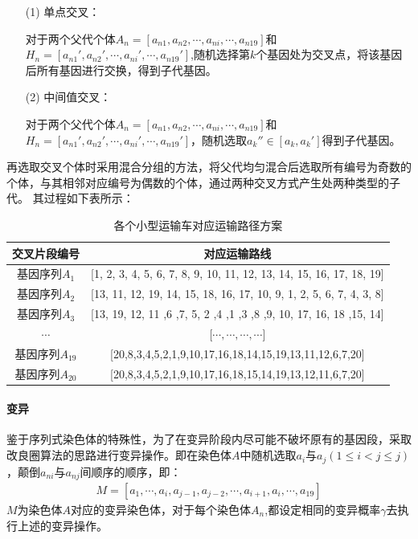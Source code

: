 \documentclass{whutmod}
\begin{document}
        \begin{itemize}
        	\item [(1)]单点交叉：
        	
        	对于两个父代个体$ A_n=[a_{n1},a_{n2},\cdots,a_{ni},\cdots,a_{n19}]$和$H_n=[a_{n1}',a_{n2}',\cdots,a_{ni}',\cdots,a_{n19}']$,随机选择第$k$个基因处为交叉点，将该基因后所有基因进行交换，得到子代基因。
        	\item [(2)]中间值交叉：
        	
        	对于两个父代个体$ A_n=[a_{n1},a_{n2},\cdots,a_{ni},\cdots,a_{n19}]$和	$H_n=[a_{n1}',a_{n2}',\cdots,a_{ni}',\cdots,a_{n19}']$，随机选取$a_{k}''\in [a_{k},a_{k}']$得到子代基因。
        \end{itemize}
        再选取交叉个体时采用混合分组的方法，将父代均匀混合后选取所有编号为奇数的个体，与其相邻对应编号为偶数的个体，通过两种交叉方式产生处两种类型的子代。
    	其过程如下表所示：
    	  	\begin{table}[H]
    		\centering	
    		  			\caption{各个小型运输车对应运输路径方案}\label{zhuansasgggggzai}
    		\begin{tabular}{cc}
    			\toprule[2pt]
    			\multicolumn{1}{m{3cm}}{\centering 交叉片段编号}
    			& \multicolumn{1}{m{8cm}}{\centering 对应运输路线}
    			\\
    			\midrule[1pt]
    			基因序列$A_1$ &  [1,	2,	3,	4,	5,	6,	7,	8,	9,	10,	11,	12,	13,	14,	15,	16,	17,	18,	19] \\ 
    			基因序列$A_2$ &  [13,	11,	12,	19,	14,	15,	18,	16,	17,	10,	9,	1,	2,	5,	6,	7,	4,	3,	8] \\ 
    			基因序列$A_3$ &  [13,	19,	12,	11	,6	,7,	5,	2	,4	,1	,3	,8	,9,	10,	17,	16,	18	,15,	14] \\ 
    			$\cdots$ & [$\cdots, \cdots, \cdots, \cdots$] \\ 
    			基因序列$A_{19}$ &  [20,8,3,4,5,2,1,9,10,17,16,18,14,15,19,13,11,12,6,7,20]\\ 
    			基因序列$A_{20}$ &  [20,8,3,4,5,2,1,9,10,17,16,18,15,14,19,13,12,11,6,7,20] \\ 
    			\bottomrule[2pt]	
    		\end{tabular}
    	\end{table}
    	
    	
         \paragraph{变异}
         鉴于序列式染色体的特殊性，为了在变异阶段内尽可能不破坏原有的基因段，采取改良圈算法的思路进行变异操作。即在染色体$A$中随机选取$a_{i}$与$a_{j}(1\leqslant i<j\leqslant j )$，颠倒$a_{ni}$与$a_{nj}$间顺序的顺序，即：
          \begin{gather}
          M=[a_{1},\cdots,a_{i},a_{j-1},a_{j-2},\cdots,a_{i+1},a_{i},\cdots,a_{19}]
          \end{gather}
          $M$为染色体$A$对应的变异染色体，对于每个染色体$A_n$,都设定相同的变异概率$\gamma$去执行上述的变异操作。 
\end{document}
